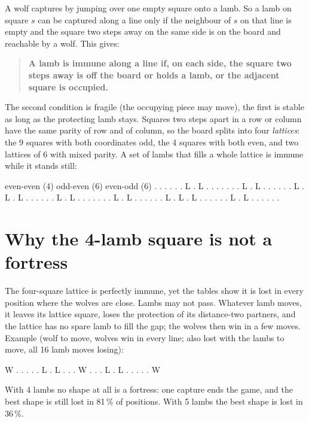\documentclass[11pt,a4paper]{article}
\begin{document}
A wolf captures by jumping over one empty square onto a lamb. So a lamb on square
$s$ can be captured along a line only if the neighbour of $s$ on that line is
empty and the square two steps away on the same side is on the board and reachable
by a wolf. This gives:

\begin{quote}
\textbf{A lamb is immune along a line if, on each side, the square two steps away
is off the board or holds a lamb, or the adjacent square is occupied.}
\end{quote}

The second condition is fragile (the occupying piece may move), the first is
stable as long as the protecting lamb stays. Squares two steps apart in a row or
column have the same parity of row and of column, so the board splits into four
\emph{lattices}: the 9 squares with both coordinates odd, the 4 squares with both
even, and two lattices of 6 with mixed parity. A set of lambs that fills a whole
lattice is immune while it stands still:

\begin{board}
   even-even (4)        odd-even (6)         even-odd (6)
   . . . . .            . L . L .            . . . . .
   . L . L .            . . . . .            L . L . L
   . . . . .            . L . L .            . . . . .
   . L . L .            . . . . .            L . L . L
   . . . . .            . L . L .            . . . . .
\end{board}

\section*{Why the 4-lamb square is not a fortress}

The four-square lattice is perfectly immune, yet the tables show it is lost in
every position where the wolves are close. Lambs may not pass. Whatever lamb
moves, it leaves its lattice square, loses the protection of its distance-two
partners, and the lattice has no spare lamb to fill the gap; the wolves then win
in a few moves. Example (wolf to move, wolves win in every line; also lost with
the lambs to move, all 16 lamb moves losing):

\begin{board}
   W . . . .
   . L . L .
   . . W . .
   . L . L .
   . . . . W
\end{board}

With 4 lambs no shape at all is a fortress: one capture ends the game, and the
best shape is still lost in 81\,\% of positions. With 5 lambs the best shape is
lost in 36\,\%.
\end{document}
